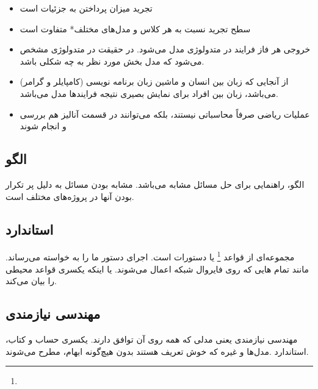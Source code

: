 \begin{itemize}
  \item تجرید میزان پرداختن به جزئیات است
  \item سطح تجرید نسبت به هر کلاس و مدل‌های مختلف* متفاوت است
  \item خروجی هر فاز فرایند در متدولوژی مدل می‌شود. در حقیقت در متدولوژی مشخص
  می‌شود که مدل بخش مورد نظر به چه شکلی باشد.
  \item از آنجایی که زبان بین انسان و ماشین زبان برنامه نویسی (کامپایلر و گرامر)
  می‌باشد، زبان بین افراد برای نمایش بصیری نتیجه فرایند‌ها مدل می‌باشد.
  \item عملیات ریاضی صرفاً محاسباتی نیستند، بلکه می‌توانند در قسمت آنالیز هم
  بررسی و انجام شوند
\end{itemize}

\subsection{الگو}

الگو، راهنمایی برای حل مسائل مشابه می‌باشد. مشابه بودن مسائل به دلیل پر تکرار
بودن آنها در پروژه‌های مختلف است.

\subsection{استاندارد}

مجموعه‌ای از قواعد \footnote{} یا دستورات است. اجرای دستور ما را به
خواسته می‌رساند. مانند تمام  هایی که روی فایروال شبکه اعمال می‌شوند. یا
اینکه یکسری قواعد محیطی را بیان می‌کند.

\subsection{مهندسی نیازمندی}

مهندسی نیازمندی یعنی مدلی که همه روی آن توافق دارند. یکسری حساب و کتاب،
استاندارد .مدل‌ها و غیره که خوش تعریف هستند بدون هیچ‌گونه ابهام، مطرح می‌شوند.


